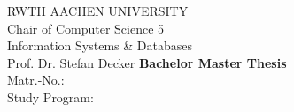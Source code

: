 \author{\firstname{ }\lastname}

\begin{titlepage}
        {\Large
                \begin{center}
                        \vfill {RWTH AACHEN UNIVERSITY\\
                                Chair of Computer Science 5\\
                                Information Systems \& Databases\\
                                Prof. Dr. Stefan Decker}
                        \vfill {\textbf{\ifdefined\BACHELOR Bachelor \else Master \fi Thesis \ifdefined\PROPOSAL
                                                \PROPOSAL
                                        \fi}}
                        \vfill {{\textbf{\thetitle}}}
                        \vfill {\theauthor\\
                                Matr.-No.: \matrNo\\
                                Study Program: \studyProgram \\
                                \thedate}
                        \vfill {
                                \begin{tabular}{ll}


\end{tabular}}
\end{center}}
\end{titlepage}
